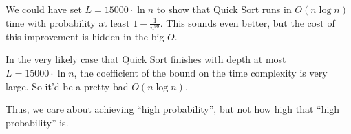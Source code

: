 \begin{remark}
    We could have set $L = 15000 \cdot \ln n$ to show that Quick Sort runs in $O(n \log n)$ time with probability at least $1 - \frac{1}{n^{99}}$.  This sounds even better, but the cost of this improvement is hidden in the big-$O$.
    
    In the very likely case that Quick Sort finishes with depth at most $L = 15000 \cdot \ln n$, the coefficient of the bound on the time complexity is very large.  So it'd be a pretty bad $O(n \log n)$.
    
    Thus, we care about achieving ``high probability'', but not how high that ``high probability'' is.
\end{remark}

